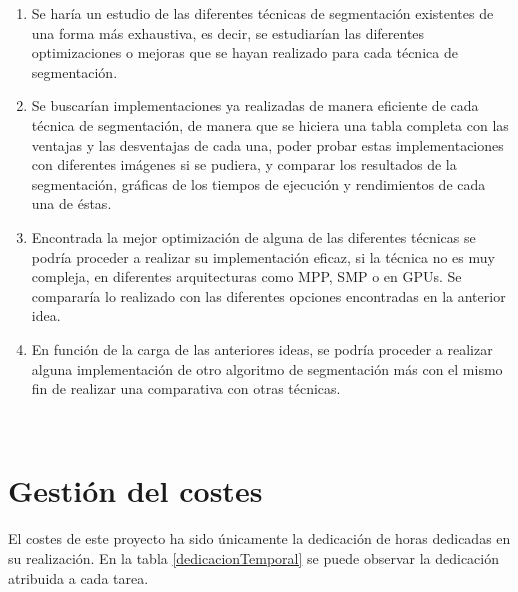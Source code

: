 \begin{enumerate}
	\item Se har\'{i}a un estudio de las diferentes t\'{e}cnicas de segmentaci\'{o}n existentes de una forma m\'{a}s exhaustiva, es decir, se estudiar\'{i}an las diferentes optimizaciones o mejoras que se hayan realizado para cada t\'{e}cnica de segmentaci\'{o}n. 
	\item Se buscar\'{i}an implementaciones ya realizadas de manera eficiente de cada t\'{e}cnica de segmentaci\'{o}n, de manera que se hiciera una tabla completa con las ventajas y las desventajas de cada una, poder probar estas implementaciones con diferentes im\'{a}genes si se pudiera, y comparar los resultados de la segmentaci\'{o}n, gr\'{a}ficas de los tiempos de ejecuci\'{o}n y rendimientos de cada una de \'{e}stas. 
	\item Encontrada la mejor optimizaci\'{o}n de alguna de las diferentes t\'{e}cnicas se podr\'{i}a proceder a realizar su implementaci\'{o}n eficaz, si la t\'{e}cnica no es muy compleja, en diferentes arquitecturas como MPP, SMP o en GPUs. Se comparar\'{i}a lo realizado con las diferentes opciones encontradas en la anterior idea. 
	\item En funci\'{o}n de la carga de las anteriores ideas, se podr\'{i}a proceder a realizar alguna implementaci\'{o}n de otro algoritmo de segmentaci\'{o}n m\'{a}s con el mismo fin de realizar una comparativa con otras t\'{e}cnicas.
\end{enumerate}
 
\

\section{Gesti\'{o}n del costes}

El costes de este proyecto ha sido \'{u}nicamente la dedicaci\'{o}n de horas dedicadas en su realizaci\'{o}n. En la tabla \ref{dedicacionTemporal} se puede observar la dedicaci\'{o}n atribuida a cada tarea.
 
\

